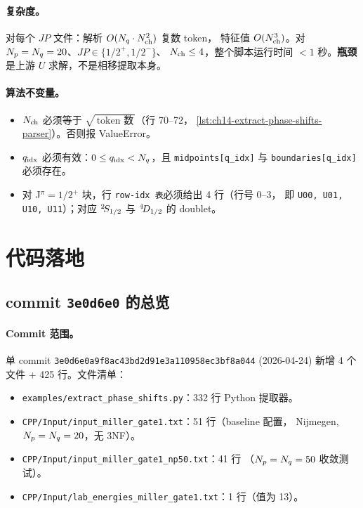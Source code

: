 \paragraph{复杂度。}
对每个 \(JP\) 文件：解析 \(O(N_q \cdot N_{\rm ch}^2)\) 复数 token，
特征值 \(O(N_{\rm ch}^3)\)。对 \(N_p = N_q = 20\)、\(JP \in \{1/2^+, 1/2^-\}\)、
\(N_{\rm ch} \le 4\)，整个脚本运行时间 \(< 1\) 秒。\textbf{瓶颈}是上游
\(U\) 求解，不是相移提取本身。

\paragraph{算法不变量。}
\begin{itemize}
  \item \(N_{\rm ch}\) 必须等于 \(\sqrt{\,\text{token 数}\,}\)（行 70--72，
        \cref{lst:ch14-extract-phase-shifts-parser}）。否则报 ValueError。
  \item \(q_{\rm idx}\) 必须有效：\(0 \le q_{\rm idx} < N_q\)，且
        \texttt{midpoints[q\_idx]} 与 \texttt{boundaries[q\_idx]} 必须存在。
  \item 对 J\(^\pi = 1/2^+\) 块，行 \texttt{row-idx 表}必须给出 4 行（行号 0--3，
        即 \verb|U00, U01, U10, U11|）；对应 \({}^{2}\!S_{1/2}\) 与
        \({}^{4}\!D_{1/2}\) 的 doublet。
\end{itemize}

\section{代码落地}
\label{sec:ch14-code}

\subsection{commit \texttt{3e0d6e0} 的总览}
\label{subsec:ch14-commit-overview}

\paragraph{Commit 范围。}
单 commit \texttt{3e0d6e0a9f8ac43bd2d91e3a110958ec3bf8a044} (2026-04-24)
新增 4 个文件 + 425 行。文件清单：
\begin{itemize}
  \item \texttt{examples/extract\_phase\_shifts.py}：332 行 Python 提取器。
  \item \texttt{CPP/Input/input\_miller\_gate1.txt}：51 行（baseline 配置，
        Nijmegen, \(N_p = N_q = 20\)，无 3NF）。
  \item \texttt{CPP/Input/input\_miller\_gate1\_np50.txt}：41 行
        （\(N_p = N_q = 50\) 收敛测试）。
  \item \texttt{CPP/Input/lab\_energies\_miller\_gate1.txt}：1 行（值为 13）。
\end{itemize}

